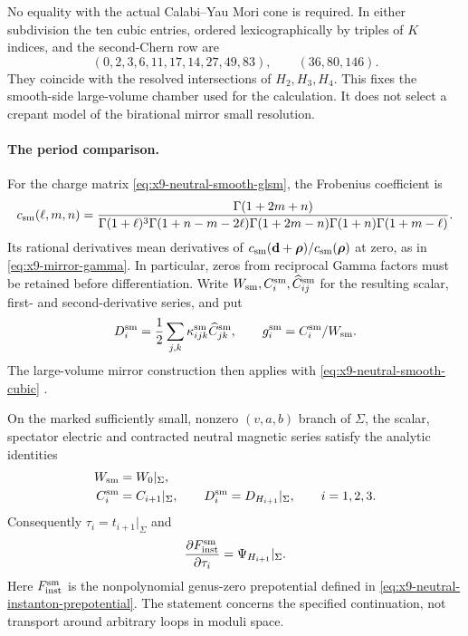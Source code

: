No equality with the actual Calabi--Yau Mori cone is required.
In either subdivision the ten cubic entries, ordered lexicographically
by triples of $K$ indices, and the second-Chern row are
\begin{equation}
 (0,2,3,6,11,17,14,27,49,83),\qquad (36,80,146).
 \label{eq:x9-neutral-smooth-cubic}
\end{equation}
They coincide with the resolved intersections of $H_2,H_3,H_4$.
This fixes the smooth-side large-volume chamber used for the
calculation. It does not select a crepant model of the birational
mirror small resolution.

\paragraph{The period comparison.}
For the charge matrix \eqref{eq:x9-neutral-smooth-glsm}, the
Frobenius coefficient is
\begin{equation}
 c_{\rm sm}(\ell,m,n)=
 \frac{\Gamma(1+2m+n)}
 {\Gamma(1+\ell)^3\Gamma(1+n-m-2\ell)
  \Gamma(1+2m-n)\Gamma(1+n)\Gamma(1+m-\ell)}.
 \label{eq:x9-neutral-smooth-gamma}
\end{equation}
Its rational derivatives mean derivatives of
$c_{\rm sm}(\mathbf d+\boldsymbol\rho)/
c_{\rm sm}(\boldsymbol\rho)$ at zero, as in
\eqref{eq:x9-mirror-gamma}. In particular, zeros from reciprocal
Gamma factors must be retained before differentiation. Write
$W_{\rm sm},C^{\rm sm}_i,\widehat C^{\rm sm}_{ij}$ for the
resulting scalar, first- and second-derivative series, and put
\begin{equation}
 D^{\rm sm}_i=\frac12\sum_{j,k}\kappa^{\rm sm}_{ijk}
                    \widehat C^{\rm sm}_{jk},\qquad
 g^{\rm sm}_i=C^{\rm sm}_i/W_{\rm sm}.
 \label{eq:x9-neutral-smooth-jets}
\end{equation}
The large-volume mirror construction then applies with
\eqref{eq:x9-neutral-smooth-cubic}
\cite[Section~4.4]{Demirtas:2024Mirror}.

\begin{proposition}\label{prop:x9-neutral-period-descent}
On the marked sufficiently small, nonzero $(v,a,b)$ branch of $\Sigma$,
the scalar, spectator electric and contracted neutral magnetic series
satisfy the analytic identities
\begin{equation}
 \begin{aligned}
 W_{\rm sm}&=W_0|_\Sigma,\\
 C^{\rm sm}_i&=C_{i+1}|_\Sigma,\qquad
 D^{\rm sm}_i=D_{H_{i+1}}|_\Sigma,
       \qquad i=1,2,3.
 \end{aligned}
 \label{eq:x9-neutral-jet-comparison}
\end{equation}
Consequently $\tau_i=t_{i+1}|_\Sigma$ and
\begin{equation}
 \frac{\partial F^{\rm sm}_{\rm inst}}{\partial\tau_i}
 =\Psi_{H_{i+1}}|_\Sigma.
 \label{eq:x9-neutral-exact-instanton-gradient}
\end{equation}
Here $F^{\rm sm}_{\rm inst}$ is the nonpolynomial genus-zero
prepotential defined in \eqref{eq:x9-neutral-instanton-prepotential}.
The statement concerns the specified continuation, not transport
around arbitrary loops in moduli space.
\end{proposition}

